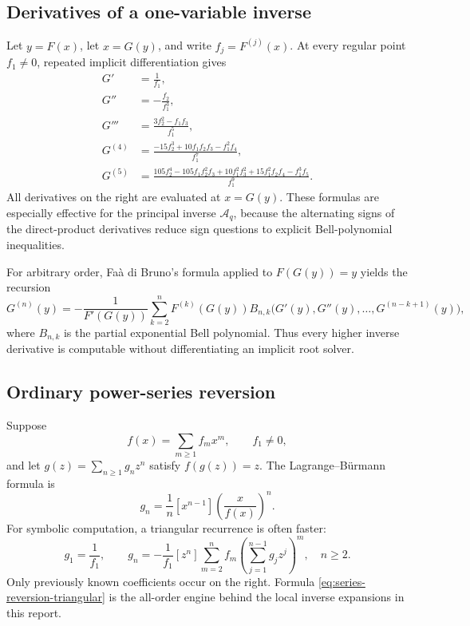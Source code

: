 \documentclass[11pt,oneside]{article}
\theoremstyle{definition}
\theoremstyle{remark}
\theoremstyle{plain}
\theoremstyle{definition}
\theoremstyle{remark}
\newcommand{\Aq}{\mathcal A_q}
\numberwithin{equation}{section}
\numberwithin{figure}{section}
\numberwithin{table}{section}
\let\reportsubsection\subsection
\let\reportsubsubsection\subsubsection
\let\section\reportsubsection
\let\subsection\reportsubsubsection
\begin{document}
\section{Derivatives of a one-variable inverse}
Let \(y=F(x)\), let \(x=G(y)\), and write
\(f_j=F^{(j)}(x)\).  At every regular point \(f_1\ne0\), repeated
implicit differentiation gives
\begin{align}
 G'&=\frac1{f_1},\label{eq:inverse-derivative-1}\\
 G''&=-\frac{f_2}{f_1^3},\label{eq:inverse-derivative-2}\\
 G'''&=\frac{3f_2^2-f_1f_3}{f_1^5},\label{eq:inverse-derivative-3}\\
 G^{(4)}&=\frac{-15f_2^3+10f_1f_2f_3-f_1^2f_4}{f_1^7},
 \label{eq:inverse-derivative-4}\\
 G^{(5)}&=
 \frac{105f_2^4-105f_1f_2^2f_3+10f_1^2f_3^2
       +15f_1^2f_2f_4-f_1^3f_5}{f_1^9}.
 \label{eq:inverse-derivative-5}
\end{align}
All derivatives on the right are evaluated at \(x=G(y)\).  These formulas
are especially effective for the principal inverse \(\Aq\), because the
alternating signs of the direct-product derivatives reduce sign questions to
explicit Bell-polynomial inequalities.

For arbitrary order, Fa\`a di Bruno's formula applied to
\(F(G(y))=y\) yields the recursion
\begin{equation}
 G^{(n)}(y)
 =-\frac1{F'(G(y))}
 \sum_{k=2}^{n}F^{(k)}(G(y))
 B_{n,k}\bigl(G'(y),G''(y),\ldots,G^{(n-k+1)}(y)\bigr),
 \label{eq:inverse-derivative-bell-recursion}
\end{equation}
where \(B_{n,k}\) is the partial exponential Bell polynomial.  Thus every
higher inverse derivative is computable without differentiating an implicit
root solver.

\section{Ordinary power-series reversion}
Suppose
\[
 f(x)=\sum_{m\ge1}f_mx^m,
 \qquad f_1\ne0,
\]
and let \(g(z)=\sum_{n\ge1}g_nz^n\) satisfy \(f(g(z))=z\).  The
Lagrange--B\"urmann formula is
\begin{equation}
 g_n=\frac1n[x^{n-1}]\left(\frac{x}{f(x)}\right)^n.
 \label{eq:lagrange-burmann-coefficients}
\end{equation}
For symbolic computation, a triangular recurrence is often faster:
\begin{equation}
 g_1=\frac1{f_1},
 \qquad
 g_n=-\frac1{f_1}[z^n]
 \sum_{m=2}^{n}f_m
 \left(\sum_{j=1}^{n-1}g_jz^j\right)^m,
 \quad n\ge2.
 \label{eq:series-reversion-triangular}
\end{equation}
Only previously known coefficients occur on the right.  Formula
\eqref{eq:series-reversion-triangular} is the all-order engine behind the
local inverse expansions in this report.
\end{document}
